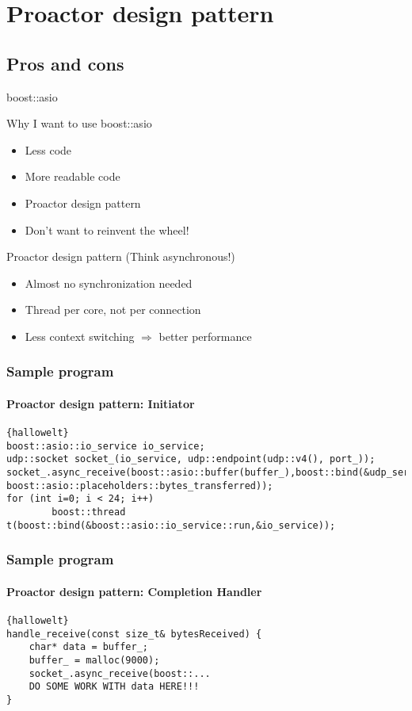 \section{Proactor design pattern}
\subsection{Pros and cons}


\begin{frame}{boost::asio}
	\begin{block}{Why I want to use boost::asio}
		\begin{itemize}
		  \item Less code
		  \item More readable code
		  \item Proactor design pattern
		  \item Don't want to reinvent the wheel!
		\end{itemize}
	\end{block}
	\begin{exampleblock}{Proactor design pattern (Think asynchronous!)}
		\begin{itemize}
		  \item Almost no synchronization needed
		  \item Thread per core, not per connection
		  \item Less context switching $\Rightarrow$ better performance
		\end{itemize}
	\end{exampleblock}
\end{frame}

\begin{frame}[fragile]
\frametitle{Sample program}
\framesubtitle{Proactor design pattern: Initiator}
\begin{lstlisting}[frame=trBL,caption={}]{hallowelt}
boost::asio::io_service io_service;
udp::socket socket_(io_service, udp::endpoint(udp::v4(), port_));
socket_.async_receive(boost::asio::buffer(buffer_),boost::bind(&udp_server::handle_receive,this, boost::asio::placeholders::bytes_transferred)); 
for (int i=0; i < 24; i++) 
		boost::thread t(boost::bind(&boost::asio::io_service::run,&io_service));
\end{lstlisting}
\end{frame}

\begin{frame}[fragile]
\frametitle{Sample program}
\framesubtitle{Proactor design pattern: Completion Handler}

\begin{lstlisting}[frame=trBL,caption={}]{hallowelt}
handle_receive(const size_t& bytesReceived) {
	char* data = buffer_;
	buffer_ = malloc(9000);
	socket_.async_receive(boost::...
	DO SOME WORK WITH data HERE!!!
}
\end{lstlisting}
\end{frame}